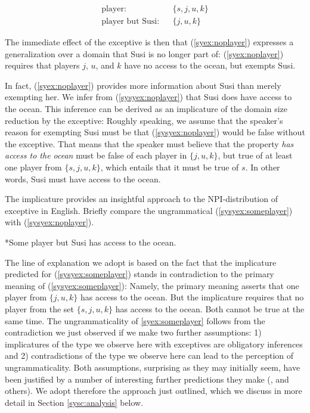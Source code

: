 \documentclass[output=paper,colorlinks,citecolor=brown,
]{langscibook}
\def\refp#1{(\ref{sy#1})}
\begin{document}
\begin{eqnarray*}
\text{player}: && \{s, j, u, k\} \\
\text{player but Susi}: && \{j, u, k\}
\end{eqnarray*}

The immediate effect of the exceptive is then that (\ref{syex:noplayer}) expresses a generalization over a domain that Susi is no longer part of:
(\ref{syex:noplayer}) requires that players $j$, $u$, and $k$ have no access to the ocean, but exempts Susi.

In fact, (\ref{syex:noplayer}) provides more information about Susi than merely exempting her. We infer from \refp{syex:noplayer} that  Susi does have access to the ocean. This inference can be derived as an implicature of the domain size reduction by the exceptive: Roughly speaking, we assume that the speaker's reason for exempting Susi must be that \refp{syex:noplayer} would be false without the exceptive.  That means that the speaker must believe that the property \emph{has access to the ocean} must be false of each player in $\{j, u, k\}$, but true of at least one player from $\{s, j, u, k\}$, which entails that it must be true of $s$. In other words, Susi must have access to the ocean.

The implicature provides an insightful approach to the NPI-distribution of exceptive in English.  Briefly compare the ungrammatical \refp{syex:someplayer} with \refp{syex:noplayer}.  

\ea \label{syex:someplayer} 
   *Some player but Susi has access to the ocean.\z

The line of explanation we adopt is based on the fact that the implicature predicted for \refp{syex:someplayer} stands in contradiction to the primary meaning of \refp{syex:someplayer}: Namely, the primary meaning asserts that one player from $\{j, u, k\}$ has access to the ocean.  But the implicature requires that no player from the set $\{s, j, u, k\}$ has access to the ocean. Both cannot be true at the same time.  The ungrammaticality of \ref{syex:someplayer} follows from the contradiction we just observed if we make two further assumptions: 1) implicatures of the type we observe here with exceptives are obligatory inferences and 2) contradictions of the type we observe here can lead to the perception of ungrammaticality.  Both assumptions, surprising as they may initially seem, have been justified by a number of interesting further predictions they make (\citealt{chierchia13a}, and others).  We adopt therefore the approach just outlined, which we discuss in more detail in Section \ref{sysc:analysis} below.
\end{document}
